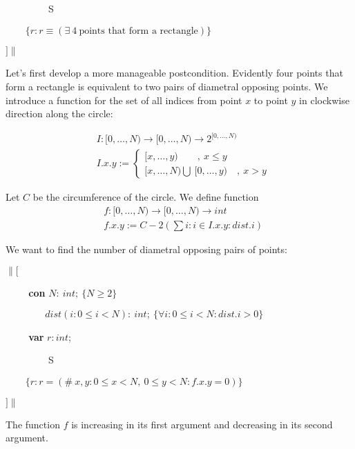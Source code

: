 \verb|        | S

\verb|    | $\{r: r \equiv (\exists\ 4\  \text{points that form a rectangle}) \}$

$]\|$

\medskip

\noindent Let's first develop a more manageable postcondition. Evidently four points that form a rectangle is equivalent to two pairs of diametral opposing points. We introduce a function for the set of all indices from point $x$ to point $y$ in clockwise direction along the circle:

\begin{equation*}
\begin{array}{ll}
& I: [0, \ldots, N) \rightarrow [0, \ldots, N) \rightarrow 2^{[0, \ldots, N)} \\
& I.x.y :=
\begin{cases}
[x, \ldots, y)\qquad,\  x \leq y \\
[x, \ldots, N) \bigcup\  [0, \ldots, y) \quad,\ x > y
 \end{cases}
 \end{array}
\end{equation*}

\noindent Let $C$ be the circumference of the circle.
\noindent We define function
\begin{equation*}
\begin{array}{ll}
   & f : [0, \ldots, N) \rightarrow [0, \ldots, N) \rightarrow int \\
   & f.x.y := C - 2 (\sum i: i \in I.x.y : dist.i)
\end{array}
\end{equation*}

\noindent We want to find the number of diametral opposing pairs of points:\medskip

$\|[$

\verb|    | \textbf{con} $N:\ int;\ \{N \geq 2\}$

\verb|        | $dist(i: 0 \leq i < N):\ int;\ \{\forall i: 0 \leq i < N: dist.i > 0\}$

\verb|    | \textbf{var} $r: int$;

\verb|        | S

\verb|    | $\{r: r = (\#\ x, y: 0 \leq x < N,\  0 \leq y < N: f.x.y = 0) \}$

$]\|$

\medskip

\begin{lem}\label{slope}
The function $f$ is increasing in its first argument and decreasing in its second argument.
\end{lem}

